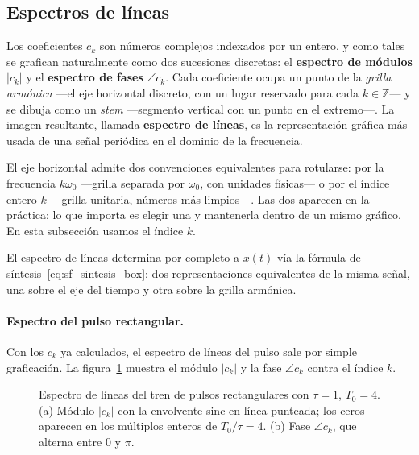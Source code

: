 \documentclass[class=book, crop=false]{standalone}
\begin{document}
\subsection{Espectros de líneas}
\label{subsec:espectros_lineas}

Los coeficientes $c_k$ son números complejos indexados por un
entero, y como tales se grafican naturalmente como dos
sucesiones discretas: el \textbf{espectro de módulos} $|c_k|$
y el \textbf{espectro de fases} $\angle c_k$. Cada coeficiente
ocupa un punto de la \emph{grilla armónica} ---el eje
horizontal discreto, con un lugar reservado para cada
$k\in\mathbb{Z}$--- y se dibuja como un \emph{stem}
---segmento vertical con un punto en el extremo---. La imagen
resultante, llamada \textbf{espectro de líneas}, es la
representación gráfica más usada de una señal periódica en el
dominio de la frecuencia.

El eje horizontal admite dos convenciones equivalentes para
rotularse: por la frecuencia $k\omega_0$ ---grilla separada
por $\omega_0$, con unidades físicas--- o por el índice entero
$k$ ---grilla unitaria, números más limpios---. Las dos
aparecen en la práctica; lo que importa es elegir una y
mantenerla dentro de un mismo gráfico. En esta subsección
usamos el índice $k$.

El espectro de líneas determina por completo a $x(t)$ vía la
fórmula de síntesis~\eqref{eq:sf_sintesis_box}: dos
representaciones equivalentes de la misma señal, una sobre el
eje del tiempo y otra sobre la grilla armónica.

\paragraph{Espectro del pulso rectangular.}
Con los $c_k$ ya calculados, el espectro de líneas del pulso
sale por simple graficación. La
figura~\ref{fig:espectro_pulso} muestra el módulo $|c_k|$ y la
fase $\angle c_k$ contra el índice $k$.

\begin{figure}[H]
    \centering
    \begin{minipage}{\linewidth}
        \centering
        
        \caption{Espectro de líneas del tren de pulsos rectangulares
                 con $\tau = 1$, $T_0 = 4$.
                 (a) Módulo $|c_k|$ con la envolvente sinc en línea
                 punteada; los ceros aparecen en los múltiplos enteros
                 de $T_0/\tau = 4$.
                 (b) Fase $\angle c_k$, que alterna entre $0$ y $\pi$.}
        \label{fig:espectro_pulso}
    \end{minipage}
\end{figure}
\end{document}
